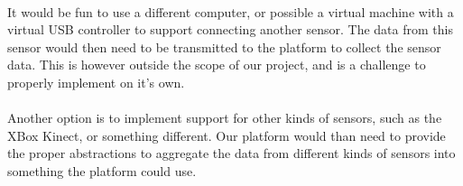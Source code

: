 \documentclass[a4paper]{article}
\begin{document}
  \paragraph{}
  It would be fun to use a different computer, or possible a virtual machine
  with a virtual USB controller to support connecting another sensor.
  The data from this sensor would then need to be
  transmitted to the platform to collect the sensor data. This is however
  outside the scope of our project, and is a challenge to properly implement on it's own.

  \paragraph{}
  Another option is to implement support for other kinds of sensors, such as the
  XBox Kinect, or something different. Our platform would than need to provide
  the proper abstractions to aggregate the data from different kinds of sensors
  into something the platform could use.
\end{document}
